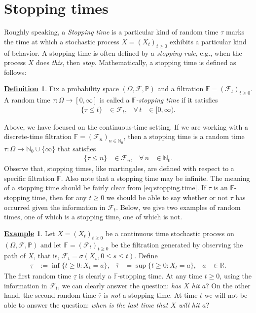 \documentclass[12pt]{book}
\numberwithin{equation}{chapter}
\theoremstyle{plain}
\numberwithin{theorem}{section}
\theoremstyle{definition}
\newtheorem{definition}[theorem]{\underline{Definition}}
\newtheorem{example}[theorem]{\underline{Example}}
\numberwithin{exercise}{chapter}
\newcommand{\<}{\langle}
\renewcommand{\>}{\rangle}
\renewcommand{\(}{\left(}
\renewcommand{\)}{\right)}
\renewcommand{\[}{\left[}
\renewcommand{\]}{\right]}
\newcommand\Fb{\mathds{F}}
\newcommand\Pb{\mathds{P}}
\newcommand\Rb{\mathds{R}}
\newcommand\Nb{\mathds{N}}
\newcommand\Fc{\mathscr{F}}
\newcommand\Om{\Omega}
\newcommand\sig{\sigma}
\newcommand{\blu}[1]{\textcolor{blue}{#1}}
\begin{document}
\section{Stopping times}
\label{sec:stopping.time}
Roughly speaking, a \emph{Stopping time} is a particular kind of random time $\tau$ marks the time at which a stochastic process $X=(X_t)_{t \geq 0}$ exhibits a particular kind of behavior.  A stopping time is often defined by a \emph{stopping rule}, e.g., when the process $X$ does \emph{this}, then \emph{stop}.  Mathematically, a stopping time is defined as follows:

\begin{definition}
\label{def:stopping.time}
Fix a probability space $(\Om,\Fc,\Pb)$ and a filtration $\Fb = (\Fc_t)_{t \geq 0}$.  A random time $\tau : \Om \to [0,\infty]$ is called a \emph{$\Fb$-stopping time} if it satisfies
\begin{align}
\{ \tau \leq t \}
	&\in \Fc_t , &
\forall \, t
	&\in [0,\infty) . \label{eq:stopping.time}
\end{align}
\end{definition}

\noindent
Above, we have focused on the continuous-time setting.  If we are working with a discrete-time filtration $\Fb = (\Fc_n)_{n \in \Nb_0}$, then a stopping time is a random time $\tau : \Om \to \Nb_0 \cup \{ \infty \}$ that satisfies
\begin{align}
\{ \tau \leq n \}
	&\in \Fc_n , &
\forall \, n
	&\in \Nb_0 . 
\end{align}
Observe that, stopping times, like martingales, are defined with respect to a specific filtration $\Fb$.  Also note that a stopping time may be infinite.  The meaning of a stopping time should be fairly clear from \eqref{eq:stopping.time}.  If $\tau$ is an $\Fb$-stopping time, then for any $t \geq 0$ we should be able to say whether or not $\tau$ has occurred given the information in $\Fc_t$.  Below, we give two examples of random times, one of which is a stopping time, one of which is not.

\begin{example}
Let $X = (X_t)_{t \geq 0}$ be a continuous time stochastic process on $(\Om,\Fc,\Pb)$ and let $\Fb = (\Fc_t)_{t \geq 0}$ be the filtration generated by observing the path of $X$, that is, $\Fc_t = \sig( X_s, 0 \leq s \leq t)$.  Define
\begin{align}
\underline{\tau}
	&:=	\inf\{ t \geq 0 : X_t = a \} , &
\overline{\tau}
	&=	\sup\{ t \geq 0 : X_t = a \} , &
a
	&\in \Rb .
\end{align}
The first random time $\underline{\tau}$ is clearly a $\Fb$-stopping time.  At any time $t \geq 0$, using the information in $\Fc_t$, we can clearly answer the question: \emph{has $X$ hit $a$}?  On the other hand, the second random time $\overline{\tau}$ is \emph{not} a stopping time.  At time $t$ we will not be able to answer the question: \emph{when is the last time that $X$ will hit $a$}?
\end{example}
\end{document}
